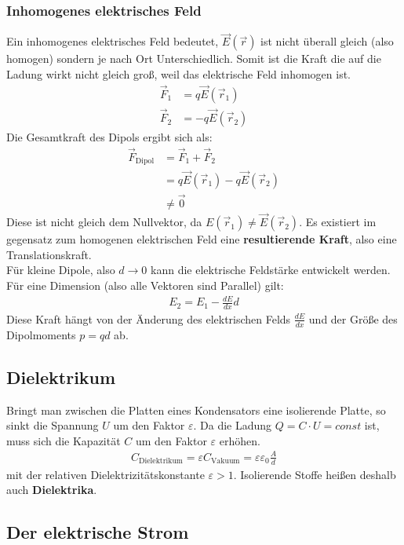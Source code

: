 \documentclass{scrartcl}
\begin{document}
\subsubsection{Inhomogenes elektrisches Feld}
Ein inhomogenes elektrisches Feld bedeutet, $\vec{E}(\vec{r})$ ist nicht überall gleich (also homogen) sondern je nach Ort Unterschiedlich.
Somit ist die Kraft die auf die Ladung wirkt nicht gleich groß, weil das elektrische Feld inhomogen ist.
\begin{align}
    \vec{F}_1&=q\vec{E}(\vec{r}_1)\\
    \vec{F}_2&=-q\vec{E}(\vec{r}_2)
\end{align}
Die Gesamtkraft des Dipols ergibt sich als:
\begin{align}
    \vec{F}_\mathrm{Dipol}&=\vec{F}_1+\vec{F}_2\\
    &=q\vec{E}(\vec{r}_1)-q\vec{E}(\vec{r}_2)\\
    &\not=\vec{0}
\end{align}
Diese ist nicht gleich dem Nullvektor, da $E(\vec{r}_1)\not=\vec{E}(\vec{r}_2)$.
Es existiert im gegensatz zum homogenen elektrischen Feld eine \textbf{resultierende Kraft}, also eine Translationskraft.\\

\noindent Für kleine Dipole, also $d\to 0$ kann die elektrische Feldstärke entwickelt werden. 
Für eine Dimension (also alle Vektoren sind Parallel) gilt:
\begin{align}
    E_2=E_1-\frac{dE}{dx}d
\end{align}
Diese Kraft hängt von der Änderung des elektrischen Felds $\frac{dE}{dx}$ und der Größe des Dipolmoments $p=qd$ ab.

\subsection{Dielektrikum}
Bringt man zwischen die Platten eines Kondensators eine isolierende Platte, so sinkt die Spannung $U$ um den Faktor $\varepsilon$.
Da die Ladung $Q=C\cdot U=const$ ist, muss sich die Kapazität $C$ um den Faktor $\varepsilon$ erhöhen.
\begin{align}
    C_\mathrm{Dielektrikum}=\varepsilon C_\mathrm{Vakuum}=\varepsilon\varepsilon_0\frac{A}{d}
\end{align}
mit der relativen Dielektrizitätskonstante $\varepsilon>1$.
Isolierende Stoffe heißen deshalb auch \textbf{Dielektrika}.


\subsection{Der elektrische Strom}
\end{document}
